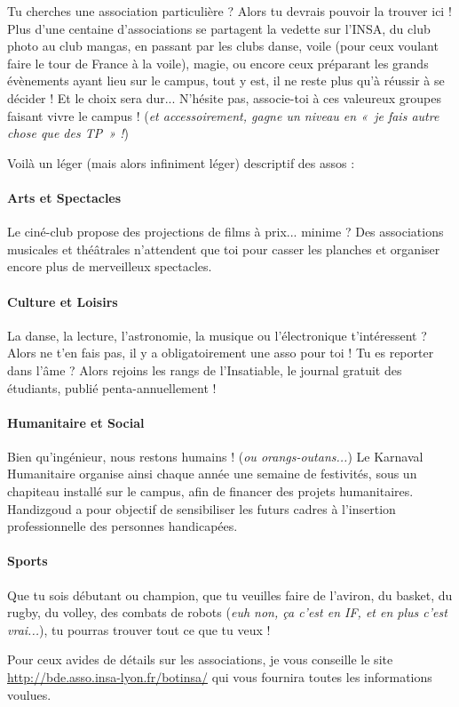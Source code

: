 Tu cherches une association particulière ? Alors tu devrais pouvoir la trouver ici !
Plus d'une centaine d'associations se partagent la vedette sur l'INSA, du club photo au club mangas, en
passant par les clubs danse, voile (pour ceux
voulant faire le tour de France à la voile), magie, ou encore ceux
préparant les grands évènements ayant lieu sur le campus, tout y est, il ne
reste plus qu'à réussir à se décider ! Et le choix sera dur...
N'hésite pas, associe-toi à ces valeureux groupes faisant vivre le campus ! (\emph{et accessoirement, gagne un niveau en «~je fais autre chose que
des TP~» !})

\vspace{1em}

Voilà un léger (mais alors infiniment léger) descriptif des assos :

\paragraph{Arts et Spectacles}
Le ciné-club propose des projections de films à prix... minime ?
Des associations musicales et théâtrales n'attendent que toi pour casser les planches et organiser encore plus de merveilleux spectacles.

\paragraph{Culture et Loisirs}
La danse, la lecture, l'astronomie, la musique ou l'électronique t'intéressent ?
Alors ne t'en fais pas, il y a obligatoirement une asso pour toi !
Tu es reporter dans l'âme ? Alors rejoins les rangs de l'Insatiable, le journal gratuit des étudiants, publié penta-annuellement !

\paragraph{Humanitaire et Social}
Bien qu'ingénieur, nous restons humains ! (\emph{ou orangs-outans...})
Le Karnaval Humanitaire organise ainsi chaque année une semaine de festivités,
sous un chapiteau installé sur le campus, afin de financer des projets
humanitaires.
Handizgoud a pour objectif de sensibiliser les futurs cadres à l'insertion
professionnelle des personnes handicapées.

\paragraph{Sports}
Que tu sois débutant ou champion, que tu veuilles faire de l'aviron, du
basket, du rugby, du volley, des combats de robots (\emph{euh non, ça
c'est en IF, et en plus c'est vrai...}), tu pourras trouver tout ce que tu veux !

\vspace{1em}

Pour ceux avides de détails sur les associations, je vous conseille le site 
\url{http://bde.asso.insa-lyon.fr/botinsa/} qui vous fournira toutes les
informations voulues.

